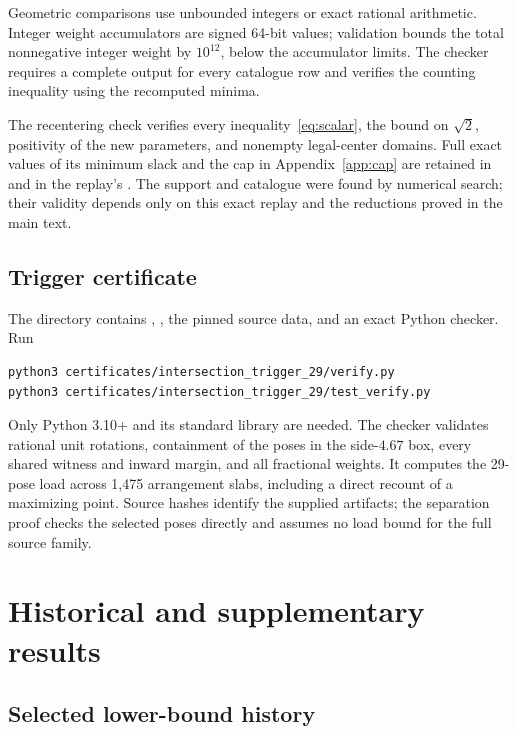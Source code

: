 \documentclass[11pt]{article}
\begin{document}
Geometric comparisons use unbounded integers or exact rational arithmetic.
Integer weight accumulators are signed 64-bit values; validation bounds the
total nonnegative integer weight by $10^{12}$, below the accumulator limits.
The checker requires a complete output for every catalogue row and verifies
the counting inequality using the recomputed minima.

The recentering check verifies every inequality~\eqref{eq:scalar}, the bound
on $\sqrt2$, positivity of the new parameters, and nonempty legal-center
domains. Full exact values of its minimum slack and the cap in
Appendix~\ref{app:cap} are retained in  and in the replay's
. The support and catalogue were found by numerical
search; their validity depends only on this exact replay and the reductions
proved in the main text.

\subsection{Trigger certificate}

The directory  contains
, , the
pinned source data, and an exact Python checker. Run
\begin{verbatim}
python3 certificates/intersection_trigger_29/verify.py
python3 certificates/intersection_trigger_29/test_verify.py
\end{verbatim}
Only Python 3.10+ and its standard library are needed. The checker validates
rational unit rotations, containment of the poses in the side-$4.67$ box,
every shared witness and inward margin, and all fractional weights. It
computes the 29-pose load across 1,475 arrangement slabs, including a direct
recount of a maximizing point. Source hashes identify the supplied artifacts;
the separation proof checks the selected poses directly and assumes no load
bound for the full source family.

\section{Historical and supplementary results}\label{app:history}

\subsection{Selected lower-bound history}
\end{document}
